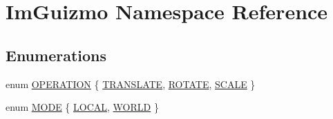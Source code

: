 \hypertarget{namespace_im_guizmo}{}\section{Im\+Guizmo Namespace Reference}
\label{namespace_im_guizmo}
\subsection*{Enumerations}
\begin{DoxyCompactItemize}
\item 
enum \mbox{\hyperlink{namespace_im_guizmo_a3559e88fd6409ce121ee4d9847867cd1}{O\+P\+E\+R\+A\+T\+I\+ON}} \{ \mbox{\hyperlink{namespace_im_guizmo_a3559e88fd6409ce121ee4d9847867cd1a87d39725b76eb0cdd7d8803632faba68}{T\+R\+A\+N\+S\+L\+A\+TE}}, 
\mbox{\hyperlink{namespace_im_guizmo_a3559e88fd6409ce121ee4d9847867cd1a002a0a905af7f2fd542df7d6e34c1d1f}{R\+O\+T\+A\+TE}}, 
\mbox{\hyperlink{namespace_im_guizmo_a3559e88fd6409ce121ee4d9847867cd1a17ec357fe247a9aa2d1f368353690fdc}{S\+C\+A\+LE}}
 \}
\item 
enum \mbox{\hyperlink{namespace_im_guizmo_a555eafa3970d08a1afb7b47bce89d05a}{M\+O\+DE}} \{ \mbox{\hyperlink{namespace_im_guizmo_a555eafa3970d08a1afb7b47bce89d05aaf0baed0c04cc42cc097e385019888fe7}{L\+O\+C\+AL}}, 
\mbox{\hyperlink{namespace_im_guizmo_a555eafa3970d08a1afb7b47bce89d05aa0db6bcb67dbf7b93b609e4d142320421}{W\+O\+R\+LD}}
 \}
\end{DoxyCompactItemize}
